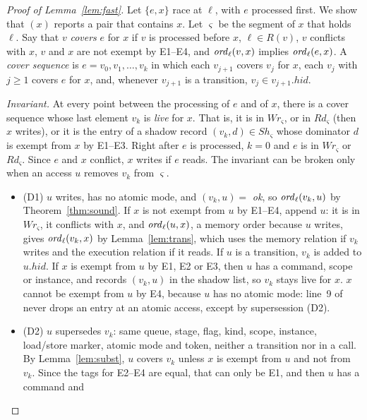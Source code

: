 \begin{proof}[Proof of Lemma~\ref{lem:fast}]
Let $\{e,x\}$ race at $\ell$, with $e$ processed first. We show that $(x)$ reports a pair that contains $x$.
Let $\varsigma$ be the segment of $x$ that holds $\ell$. Say that $v$ \emph{covers} $e$ for $x$ if $v$ is processed
before $x$, $\ell \in R(v)$, $v$ conflicts with $x$, $v$ and $x$ are not exempt by E1--E4, and $\mathit{ord}_{\ell}(v,x)$
implies $\mathit{ord}_{\ell}(e,x)$. A \emph{cover sequence} is $e = v_0, v_1, \dots, v_k$ in which each $v_{j+1}$ covers $v_j$
for $x$, each $v_j$ with $j \ge 1$ covers $e$ for $x$, and, whenever $v_{j+1}$ is a transition, $v_j \in
v_{j+1}.\mathit{hid}$.

\emph{Invariant.} At every point between the processing of $e$ and of $x$, there is a cover sequence whose last element
$v_k$ is \emph{live} for $x$. That is, it is in $\mathit{Wr}_\varsigma$, or in $\mathit{Rd}_\varsigma$ (then $x$
writes), or it is the entry of a shadow record $(v_k, d) \in \mathit{Sh}_\varsigma$ whose dominator $d$ is exempt
from $x$ by E1--E3. Right after $e$ is processed, $k = 0$ and $e$ is in $\mathit{Wr}_\varsigma$ or
$\mathit{Rd}_\varsigma$. Since $e$ and $x$ conflict, $x$ writes if $e$ reads. The invariant can be broken only when an
access $u$ removes $v_k$ from $\varsigma$.
\begin{itemize}
\item (D1) $u$ writes, has no atomic mode, and $(v_k,u) = $ \emph{ok}, so $\mathit{ord}_{\ell}(v_k,u)$ by Theorem~\ref{thm:sound}. If $x$ is
  not exempt from $u$ by E1--E4, append $u$: it is in $\mathit{Wr}_\varsigma$, it conflicts with $x$, and
  $\mathit{ord}_{\ell}(u,x)$, a memory order because $u$ writes, gives $\mathit{ord}_{\ell}(v_k,x)$ by Lemma~\ref{lem:trans}, which
  uses the memory relation if $v_k$ writes and the execution relation if it reads. If $u$ is a transition, $v_k$ is
  added to $u.\mathit{hid}$. If $x$ is exempt from $u$ by E1, E2 or E3, then $u$ has a command, scope or instance, and
   records $(v_k, u)$ in the shadow list, so $v_k$ stays live for $x$. $x$ cannot be exempt from $u$ by E4,
  because $u$ has no atomic mode: line~9 of  never drops an entry at an atomic access, except by
  supersession (D2).
\item (D2) $u$ supersedes $v_k$: same queue, stage, flag, kind, scope, instance, load/store marker, atomic mode and
  token, neither a transition nor in a call. By Lemma~\ref{lem:subst}, $u$ covers $v_k$ unless $x$ is exempt from $u$ and
  not from $v_k$. Since the tags for E2--E4 are equal, that can only be E1, and then $u$ has a command and 

\end{itemize}
\end{proof}
